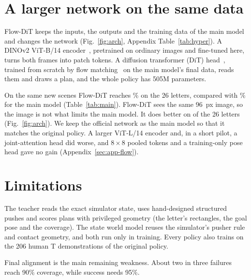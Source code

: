\documentclass[10pt,twocolumn,letterpaper]{article}
\begin{document}
\section{A larger network on the same data}
\label{sec:arch}

Flow-DiT keeps the inputs, the outputs and the training data of the main model and changes the network
(Fig.~\ref{fig:arch}, Appendix Table~\ref{tab:hyper}). A DINOv2 ViT-B/14 encoder~\citep{oquab2024dinov2}, pretrained
on ordinary images and fine-tuned here, turns both frames into patch tokens. A diffusion transformer (DiT)
head~\citep{peebles2023dit}, trained from scratch by flow matching~\citep{lipman2023flow} on the main model's final
data, reads them and draws a plan, and the whole policy has 505M parameters. %

On the same new scenes Flow-DiT reaches \numHeadFlow\% on the 26 letters, compared with \numHeadMain\% for the main
model (Table~\ref{tab:main}). Flow-DiT sees the same 96~px image, so the image is not what limits the main model. It does
better on \numLettersUpFlow{} of the 26 letters (Fig.~\ref{fig:arch}). We keep the official network as the main model
so that it matches the original policy. A larger ViT-L/14 encoder and, in a short pilot, a joint-attention head did
worse, and $8\times8$ pooled tokens and a training-only pose head gave no gain (Appendix~\ref{sec:app-flow}).

\section{Limitations}
\label{sec:limits}

The teacher reads the exact simulator state, uses hand-designed structured pushes and scores plans with privileged
geometry (the letter's rectangles, the goal pose and the coverage). The state world model reuses the simulator's
pusher rule and contact geometry, and both run only in training. Every policy also trains on the 206 human T
demonstrations of the original policy.

Final alignment is the main remaining weakness. About two in three failures reach 90\% coverage, while success needs
95\%.
\end{document}
